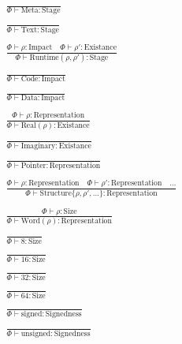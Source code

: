 \documentclass {article}
\begin{document}
\begin{gather*}
\\
\frac
{}
{\Phi \vdash \text{Meta} : \text{Stage}} \\
\\
\frac
{}
{\Phi \vdash \text{Text} : \text{Stage}} \\
\\
\frac
{\Phi \vdash \rho : \text{Impact} \quad \Phi \vdash \rho' : \text{Existance}}
{\Phi \vdash \text{Runtime} (\rho, \rho') : \text{Stage}} \\
\\
\frac
{}
{\Phi \vdash \text{Code} : \text{Impact}} \\
\\
\frac
{}
{\Phi \vdash \text{Data} : \text{Impact}} \\
\\
\frac
{\Phi \vdash \rho : \text{Representation}}
{\Phi \vdash \text{Real} (\rho) : \text{Existance}} \\
\\
\frac
{}
{\Phi \vdash \text{Imaginary} : \text{Existance}} \\
\\
\frac
{}
{\Phi \vdash \text{Pointer} : \text{Representation}} \\
\\
\frac
{\Phi \vdash \rho : \text{Representation} \quad \Phi \vdash \rho' : \text{Representation} \quad \dots}
{\Phi \vdash \text{Structure} \{ \rho, \rho', \dots \} : \text{Representation} } \\
\\
\frac
{\Phi \vdash \rho : \text{Size}}
{\Phi \vdash \text{Word} (\rho) : \text{Representation}} \\
\\
\frac
{}
{\Phi \vdash 8 : \text{Size}} \\
\\
\frac
{}
{\Phi \vdash 16 : \text{Size}} \\
\\
\frac
{}
{\Phi \vdash 32 : \text{Size}} \\
\\
\frac
{}
{\Phi \vdash 64 : \text{Size}} \\
\\
\frac
{}
{\Phi \vdash \text{signed} : \text{Signedness}} \\
\\
\frac
{}
{\Phi \vdash \text{unsigned} : \text{Signedness}} \\
\end{gather*}
\end{document}
